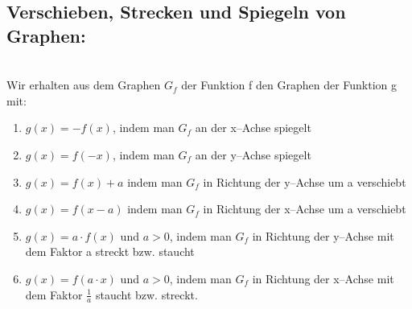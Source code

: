 \subsection{Verschieben, Strecken und Spiegeln von Graphen:}\\
Wir erhalten aus dem Graphen $G_f$ der Funktion f den Graphen der Funktion g mit:\\
\begin{enumerate}
    \item $g(x) = - f(x)$, indem man $G_f$ an der x--Achse spiegelt\\
\item $g(x) =f(-x)$, indem man $G_f$ an der y--Achse spiegelt\\
\item $g(x) = f(x) +a$ indem man $G_f$ in Richtung der y--Achse um a verschiebt\\
\item $g(x) =f(x-a)$ indem man $G_f$ in Richtung der x--Achse um a verschiebt\\
\item $g(x) =a\cdot f(x)$ und $a>0$, indem man $G_f$ in Richtung der y--Achse mit dem Faktor a streckt bzw. staucht\\
\item $g(x) =f(a\cdot x)$ und  $a>0$, indem man $G_f$ in Richtung der x--Achse mit dem Faktor $\frac{1}{a}$ staucht bzw. streckt.\\

\end{enumerate}

